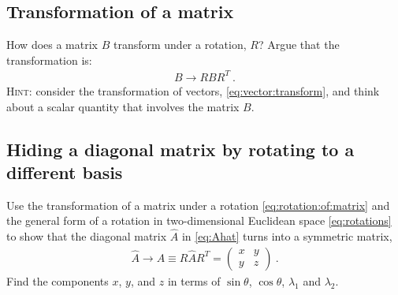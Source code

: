 \documentclass[12pt]{article}
\numberwithin{equation}{section}    %
\begin{document}



\subsection{Transformation of a matrix}

How does a matrix $B$ transform under a rotation, $R$? Argue that the transformation is: 
\begin{align}
	B \to R B R^T \ .
	\label{eq:rotation:of:matrix}
\end{align}
\textsc{Hint}: consider the transformation of vectors, \eqref{eq:vector:transform}, and think about a scalar quantity that involves the matrix $B$.

\subsection{Hiding a diagonal matrix by rotating to a different basis}

Use the transformation of a matrix under a rotation \eqref{eq:rotation:of:matrix} and the general form of a rotation in two-dimensional Euclidean space \eqref{eq:rotations} to show that the diagonal matrix $\hat A$ in \eqref{eq:Ahat} turns into a symmetric matrix,
\begin{align}
	\hat A \to A \equiv  R \hat A R^T  = 
	\begin{pmatrix}
		x & y \\
		y & z
	\end{pmatrix} \ .
	\label{eq:A:RAhatRt}
\end{align}
Find the components $x$, $y$, and $z$ in terms of $\sin\theta$, $\cos\theta$, $\lambda_1$ and $\lambda_2$.
\end{document}
